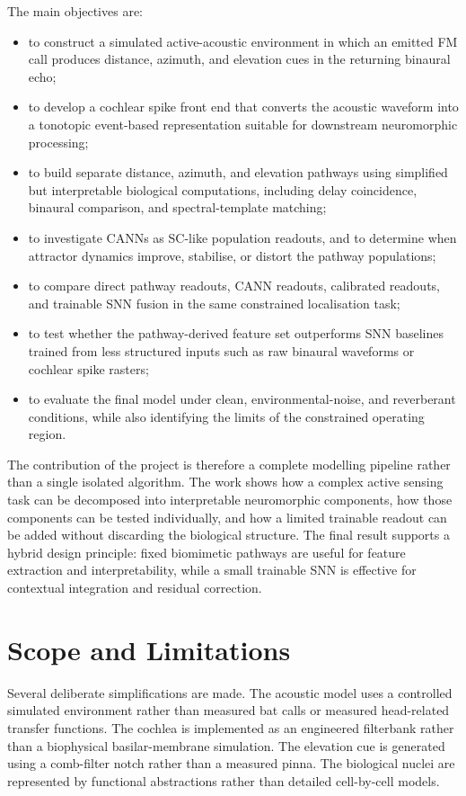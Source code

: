 The main objectives are:
\begin{itemize}
    \item to construct a simulated active-acoustic environment in which an emitted FM call produces distance, azimuth, and elevation cues in the returning binaural echo;
    \item to develop a cochlear spike front end that converts the acoustic waveform into a tonotopic event-based representation suitable for downstream neuromorphic processing;
    \item to build separate distance, azimuth, and elevation pathways using simplified but interpretable biological computations, including delay coincidence, binaural comparison, and spectral-template matching;
    \item to investigate CANNs as SC-like population readouts, and to determine when attractor dynamics improve, stabilise, or distort the pathway populations;
    \item to compare direct pathway readouts, CANN readouts, calibrated readouts, and trainable SNN fusion in the same constrained localisation task;
    \item to test whether the pathway-derived feature set outperforms SNN baselines trained from less structured inputs such as raw binaural waveforms or cochlear spike rasters;
    \item to evaluate the final model under clean, environmental-noise, and reverberant conditions, while also identifying the limits of the constrained operating region.
\end{itemize}

The contribution of the project is therefore a complete modelling pipeline rather than a single isolated algorithm. The work shows how a complex active sensing task can be decomposed into interpretable neuromorphic components, how those components can be tested individually, and how a limited trainable readout can be added without discarding the biological structure. The final result supports a hybrid design principle: fixed biomimetic pathways are useful for feature extraction and interpretability, while a small trainable SNN is effective for contextual integration and residual correction.

\section{Scope and Limitations}

Several deliberate simplifications are made. The acoustic model uses a controlled simulated environment rather than measured bat calls or measured head-related transfer functions. The cochlea is implemented as an engineered filterbank rather than a biophysical basilar-membrane simulation. The elevation cue is generated using a comb-filter notch rather than a measured pinna. The biological nuclei are represented by functional abstractions rather than detailed cell-by-cell models.

